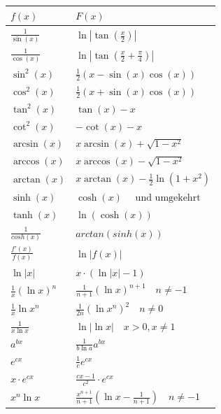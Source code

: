 \documentclass[6pt]{article}
\newcommand{\nop}[1]{}
\begin{document}
\begin{multicols*}{2}
\begin{multicols}{2}
	\columnbreak
	\hspace{-20pt}
	\begin{tabular}{l|l}
		$f(x)$ & $F(x)$ \\ \hline
		
		$ \frac{1}{\sin(x)} $  &  $ \ln \left|\tan(\frac{x}{2})\right| $ \\
		$ \frac{1}{\cos(x)} $  &  $ \ln \left|\tan(\frac{x}{2}+\frac{\pi}{4})\right| $ \\
		$ \sin^2(x) $  &  $ \frac{1}{2} (x-\sin(x)\cos(x)) $ \\
		$ \cos^2(x) $  &  $ \frac{1}{2} (x+\sin(x)\cos(x)) $ \\
		$ \tan^2(x) $  &  $ \tan(x)-x $ \\
		$ \cot^2(x) $  &  $ -\cot(x)-x $ \\
		$ \arcsin(x) $  &  $ x \arcsin(x) + \sqrt{1-x^2} $ \\
		$ \arccos(x) $  &  $ x \arccos(x) - \sqrt{1-x^2} $ \\
		$ \arctan(x) $  &  $ x \arctan(x) - \frac{1}{2} \ln (1+x^2) $ \\
		$ \sinh(x) $  &  $ \cosh(x)\quad \text{ und umgekehrt} $ \\
		$ \tanh(x) $  &  $ \ln(\cosh(x)) $ \\
		$\frac{1}{cosh(x)}$ 	& $arctan(sinh(x))$ \\
		$ \frac{f'(x)}{f(x)} $   &   $ \ln {| f(x) |} $ \\
		$ \ln |x| $  &  $ x \cdot (\ln |x| - 1) $ \\
		$ \frac{1}{x}(\ln x)^n $  &  $ \frac{1}{n+1} (\ln x)^{n+1} \quad \scriptstyle  n \neq -1 $ \\
		$ \frac{1}{x}\ln x^n $  &  $ \frac{1}{2n} (\ln x^n)^{2} \quad \scriptstyle  n \neq 0 $ \\
		$ \frac{1}{x \ln x} $  &  $ \ln |\ln x| \quad \scriptstyle x>0,x\neq 1 $ \\
		$ a^{bx} $  &  $ \frac{1}{b \ln a} a^{bx} $ \\
		$ e^{cx} $ &  $\frac{1}{c} e^{cx}$ \\
		$ x\cdot e^{cx} $  &  $ \frac{cx-1}{c^2} \cdot e^{cx} $ \\
		$ x^n \ln x $  &  $ \frac{x^{n+1}}{n+1} \left( \ln x - \frac{1}{n+1} \right) \quad \scriptstyle  n \neq -1 $ \\
		\nop{$ e^{ax} p(x) $  &  $ e^{ac} (  a^{-1} p(x) - a^{-2} p'(x)+ $ \\
		$  $  &  $ \ldots+(-1)^na^{-n-1}p^{(n)}(x) ) $ \\
		$  $  &  $ p\text{: Polynom }n\text{-ten Grades} $ \\}

\end{tabular}
\end{multicols}
\end{multicols*}
\end{document}
